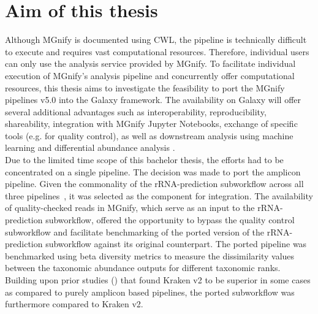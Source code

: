 \section{Aim of this thesis}\label{aim_of_thesis}
Although MGnify is documented using CWL, the pipeline is technically difficult to execute and requires vast computational resources. Therefore, individual users can only use the analysis service provided by MGnify. To facilitate individual execution of MGnify's analysis pipeline and concurrently offer computational resources, this thesis aims to investigate the feasibility to port the MGnify pipelines v5.0 into the Galaxy framework. The availability on Galaxy will offer several additional advantages such as interoperability, reproducibility, shareability, integration with MGnify Jupyter Notebooks, exchange of specific tools (e.g. for quality control), as well as downstream analysis using machine learning and differential abundance analysis .\\
Due to the limited time scope of this bachelor thesis, the efforts had to be concentrated on a single pipeline. The decision was made to port the amplicon pipeline. Given the commonality of the rRNA-prediction subworkflow across all three pipelines~\cite{mgnify_mgnify_2023}, it was selected as the component for integration. The availability of quality-checked reads in MGnify, which serve as an input to the rRNA-prediction subworkflow, offered the opportunity to bypass the quality control subworkflow and facilitate benchmarking of the ported version of the rRNA-prediction subworkflow against its original counterpart. The ported pipeline was benchmarked using beta diversity metrics to measure the dissimilarity values between the taxonomic abundance outputs for different taxonomic ranks.\\
Building upon prior studies () that found Kraken v2 to be superior in some cases as compared to purely amplicon based pipelines, the ported subworkflow was furthermore compared to Kraken v2.